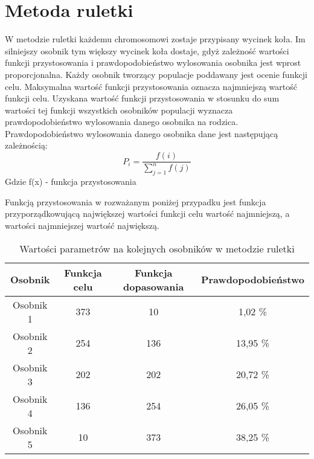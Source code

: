 
\section{Metoda ruletki}\label{sec:narzedzia}


W metodzie ruletki każdemu chromosomowi zostaje przypisany wycinek koła. Im silniejszy osobnik tym większy wycinek koła dostaje, gdyż zależność wartości funkcji przystosowania i prawdopodobieństwo wylosowania osobnika jest wprost proporcjonalna. Każdy osobnik tworzący populacje poddawany jest ocenie funkcji celu. Maksymalna wartość funkcji przystosowania oznacza najmniejszą wartość funkcji celu. Uzyskana wartość funkcji przystosowania w stosunku do sum wartości tej funkcji wszystkich osobników populacji wyznacza prawdopodobieństwo wylosowania danego osobnika na rodzica. Prawdopodobieństwo wylosowania danego osobnika dane jest następującą zależnością:
$$
P_i = \frac{f(i)}{\sum_{j=1}^{n}f(j)}
$$
Gdzie f(x) - funkcja przystosowania\\
\par
Funkcją przystosowania w rozważanym poniżej przypadku jest funkcja przyporządkowującą największej wartości funkcji celu wartość najmniejszą, a wartości najmniejszej wartość największą.

\begin{table}[h!]
\begin{center}
\begin{tabular}{|c|c|c|c|}
\hline
\textbf{Osobnik}  & \textbf{Funkcja celu} & \textbf{Funkcja dopasowania} & \textbf{Prawdopodobieństwo}\\
\hline
Osobnik 1 & 373 & 10 & 1,02  \% \\
\hline
Osobnik 2 &254 & 136  & 13,95  \% \\
\hline
Osobnik 3 & 202 & 202 & 20,72  \% \\
\hline
Osobnik 4 & 136 & 254 & 26,05  \% \\
\hline
Osobnik 5 & 10 & 373 & 38,25  \% \\
\hline
\end{tabular}
\caption{Wartości parametrów na kolejnych osobników w metodzie ruletki}
\end{center}
\end{table}

\vspace{0,4cm}

